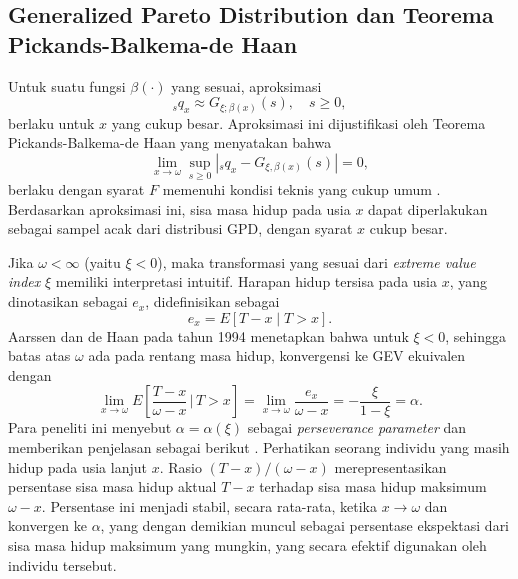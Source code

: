 \subsection{Generalized Pareto Distribution dan Teorema Pickands-Balkema-de Haan}

Untuk suatu fungsi $\beta(\cdot)$ yang sesuai, aproksimasi
\begin{equation}
    {}_sq_x \approx G_{\xi; \beta(x)}(s), \quad s \geq 0,
\end{equation}
berlaku untuk $x$ yang cukup besar. Aproksimasi ini dijustifikasi oleh Teorema Pickands-Balkema-de Haan yang menyatakan bahwa
\begin{equation}
    \lim_{x \to \omega} \sup_{s \geq 0} \left|{}_sq_x - G_{\xi, \beta(x)}(s)\right| = 0,
\end{equation}
berlaku dengan syarat $F$ memenuhi kondisi teknis yang cukup umum \citep{balkema1974residual, pickands1975statistical}. Berdasarkan aproksimasi ini, sisa masa hidup pada usia $x$ dapat diperlakukan sebagai sampel acak dari distribusi GPD, dengan syarat $x$ cukup besar.

Jika $\omega < \infty$ (yaitu $\xi < 0$), maka transformasi yang sesuai dari \textit{extreme value index} $\xi$ memiliki interpretasi intuitif. Harapan hidup tersisa pada usia $x$, yang dinotasikan sebagai $e_x$, didefinisikan sebagai
\begin{equation}
    e_x = E[T - x \mid T > x].
\end{equation}
Aarssen dan de Haan pada tahun 1994 menetapkan bahwa untuk $\xi < 0$, sehingga batas atas $\omega$ ada pada rentang masa hidup, konvergensi ke GEV ekuivalen dengan
\begin{equation}
    \lim_{x \to \omega} E\left[\frac{T - x}{\omega - x} \,\bigg|\, T > x\right] = \lim_{x \to \omega} \frac{e_x}{\omega - x} = -\frac{\xi}{1 - \xi} = \alpha.
\end{equation}
Para peneliti ini menyebut $\alpha = \alpha(\xi)$ sebagai \textit{perseverance parameter} dan memberikan penjelasan sebagai berikut \citep{aarssen1994domains}. Perhatikan seorang individu yang masih hidup pada usia lanjut $x$. Rasio $(T - x)/(\omega - x)$ merepresentasikan persentase sisa masa hidup aktual $T - x$ terhadap sisa masa hidup maksimum $\omega - x$. Persentase ini menjadi stabil, secara rata-rata, ketika $x \to \omega$ dan konvergen ke $\alpha$, yang dengan demikian muncul sebagai persentase ekspektasi dari sisa masa hidup maksimum yang mungkin, yang secara efektif digunakan oleh individu tersebut.

